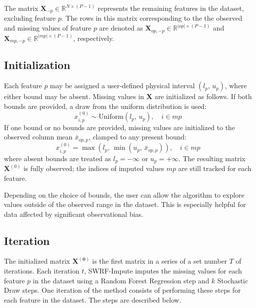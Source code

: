 \documentclass[preprint]{aastex631}
\begin{document}
The matrix $\mathbf{X}_{-p} \in \mathbb{R}^{N\times(P-1)}$ represents the remaining features in the dataset, excluding feature $p$. The rows in this matrix corresponding to the the observed and missing values of feature $p$ are denoted as $\mathbf{X}_{op,-p} \in \mathbb{R}^{|op|\times (P-1)}$ and $\mathbf{X}_{mp,-p} \in \mathbb{R}^{|mp| \times (P-1)}$, respectively.

\subsection{Initialization}
Each feature $p$ may be assigned a user-defined physical interval $(l_p,\, u_p)$, where either bound may be absent. Missing values in $\mathbf{X}$ are initialized as follows. If both bounds are provided, a draw from the uniform distribution is used:
\begin{equation}
  x^{(0)}_{i,p} \sim \mathrm{Uniform}(l_p,\, u_p), \quad i \in mp
\end{equation}
If one bound or no bounds are provided, missing values are initialized to the observed column mean $\bar{x}_{op,p}$, clamped to any present bound:
\begin{equation}
  x^{(0)}_{i,p} = \max(l_p,\, \min(u_p,\, \bar{x}_{op,p})), \quad i \in mp
\end{equation}
where absent bounds are treated as $l_p = -\infty$ or $u_p = +\infty$. The resulting matrix $\mathbf{X}^{(0)}$ is fully observed; the indices of imputed values $mp$ are still tracked for each feature.

Depending on the choice of bounds, the user can allow the algorithm to explore values outside of the observed range in the dataset. This is especially helpful for data affected by significant observational bias.

\subsection{Iteration}
The initialized matrix $\mathbf{X^{(0)}}$ is the first matrix in a series of a set number $T$ of iterations. Each iteration $t$, SWRF-Impute imputes the missing values for each feature $p$ in the dataset using a Random Forest Regression step and $k$ Stochastic Draw steps. One iteration of the method consists of performing these steps for each feature in the dataset. The steps are described below.
\end{document}
